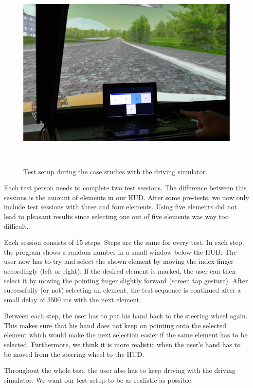 \documentclass{sigchi-ext}
\begin{document}
\FloatBarrier

\begin{figure}
\centering
  \includegraphics[width=0.9\columnwidth]{figures/testsetup.jpg}
  \caption{Test setup during the case studies with the driving simulator. }~\label{fig:figure1}
\end{figure}

Each test person needs to complete two test sessions. The difference between this sessions is the amount of elements in our HUD. After some pre-tests, we now only include test sessions with three and four elements. Using five elements did not lead to pleasant results since selecting one out of five elements was way too difficult.

Each session consists of 15 steps. Steps are the same for every test. In each step, the program shows a random number in a small window below the HUD. The user now has to try and select the shown element by moving the index finger accordingly (left or right). If the desired element is marked, the user can then select it by moving the pointing finger slightly forward (screen tap gesture). After successfully (or not) selecting an element, the test sequence is continued after a small delay of 3500 ms with the next element.

Between each step, the user has to put his hand back to the steering wheel again. This makes sure that his hand does not keep on pointing onto the selected element which would make the next selection easier if the same element has to be selected. Furthermore, we think it is more realistic when the user's hand has to be moved from the steering wheel to the HUD.

Throughout the whole test, the user also has to keep driving with the driving simulator. We want our test setup to be as realistic as possible. 
\end{document}
